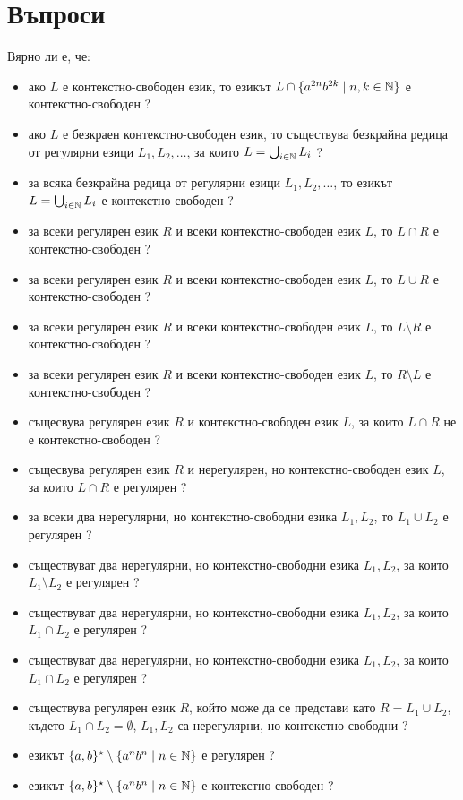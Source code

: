 \section{Въпроси}
Вярно ли е, че:
\begin{itemize}
\item
  ако $L$ е контекстно-свободен език, то езикът $L \cap \{a^{2n}b^{2k}\mid n,k\in\mathbb{N}\}$ е контекстно-свободен ?
\item
  ако $L$ е безкраен контекстно-свободен език, то съществува безкрайна редица от регулярни езици $L_1,L_2,\dots$,
  за които $L = \bigcup_{i\in\mathbb{N}}L_i$ ?
\item
  за всяка безкрайна редица от регулярни езици $L_1,L_2,\dots$, то 
  езикът $L = \bigcup_{i\in\mathbb{N}}L_i$ е контекстно-свободен ?
\item
  за всеки регулярен език $R$ и всеки контекстно-свободен език $L$, то $L \cap R$ е контекстно-свободен ?
\item
  за всеки регулярен език $R$ и всеки контекстно-свободен език $L$, то $L \cup R$ е контекстно-свободен ?
\item
  за всеки регулярен език $R$ и всеки контекстно-свободен език $L$, то $L \setminus R$ е контекстно-свободен ?
\item
  за всеки регулярен език $R$ и всеки контекстно-свободен език $L$, то $R \setminus L$ е контекстно-свободен ?
\item
  същесвува регулярен език $R$ и контекстно-свободен език $L$, за които $L \cap R$ не е контекстно-свободен ?
\item
  
  същесвува регулярен език $R$ и нерегулярен, но контекстно-свободен език $L$, за които $L \cap R$ е регулярен ?
\item
  за всеки два нерегулярни, но контекстно-свободни езика $L_1,L_2$, то $L_1\cup L_2$ е регулярен ?
\item
  съществуват два нерегулярни, но контекстно-свободни езика $L_1,L_2$, за които $L_1\setminus L_2$ е регулярен ?
\item
  съществуват два нерегулярни, но контекстно-свободни езика $L_1,L_2$, за които $L_1\cap L_2$ е регулярен ?
\item
  съществуват два нерегулярни, но контекстно-свободни езика $L_1,L_2$, за които $L_1\cap L_2$ е регулярен ?
\item
  съществува регулярен език $R$, който може да се представи като $R = L_1 \cup L_2$, където
  $L_1 \cap L_2 = \emptyset$, $L_1,L_2$ са нерегулярни, но контекстно-свободни ?
\item
  езикът $\{a,b\}^\star \setminus \{a^nb^n \mid n\in\mathbb{N}\}$ е регулярен ?
\item
  езикът $\{a,b\}^\star \setminus \{a^nb^n \mid n\in\mathbb{N}\}$ е контекстно-свободен ?
\end{itemize}

